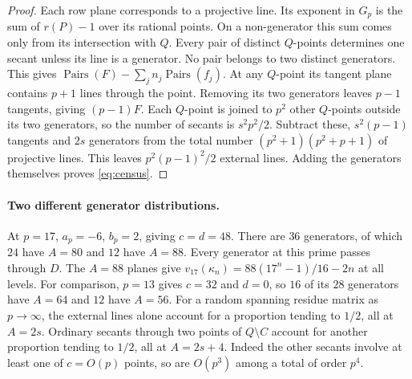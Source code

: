 \documentclass[11pt]{article}
\newcommand{\sq}{\operatorname{Pairs}}
\begin{document}
\begin{proof}
Each row plane corresponds to a projective line. Its exponent in
$G_p$ is the sum of $r(P)-1$ over its rational points. On a
non-generator this sum comes only from its intersection with $Q$.
Every pair of distinct $Q$-points determines one secant unless its
line is a generator. No pair belongs to two distinct generators.
This gives $\sq(F)-\sum_jn_j\sq(f_j)$. At any $Q$-point its tangent
plane contains $p+1$ lines through the point. Removing its two
generators leaves $p-1$ tangents, giving $(p-1)F$.
Each $Q$-point is joined to $p^2$ other $Q$-points outside its two
generators, so the number of secants is $s^2p^2/2$. Subtract these,
$s^2(p-1)$ tangents and $2s$ generators from the total number
$(p^2+1)(p^2+p+1)$ of projective lines. This leaves $p^2(p-1)^2/2$
external lines. Adding the generators themselves proves
\eqref{eq:census}.
\end{proof}

\paragraph{Two different generator distributions.}
At $p=17$, $a_p=-6$, $b_p=2$, giving $c=d=48$.
There are $36$ generators, of which $24$ have $A=80$ and $12$ have
$A=88$. Every generator at this prime passes through $D$. The
$A=88$ planes give $v_{17}(\kappa_n)=88(17^n-1)/16-2n$ at all levels.
For comparison, $p=13$ gives $c=32$ and $d=0$, so $16$ of its $28$
generators have $A=64$ and $12$ have $A=56$.
For a random spanning residue matrix as $p\to\infty$, the external
lines alone account for a proportion tending to $1/2$, all at
$A=2s$. Ordinary secants through two points of $Q\setminus C$
account for another proportion tending to $1/2$, all at $A=2s+4$.
Indeed the other secants involve at least one of $c=O(p)$ points,
so are $O(p^3)$ among a total of order $p^4$.
\end{document}
